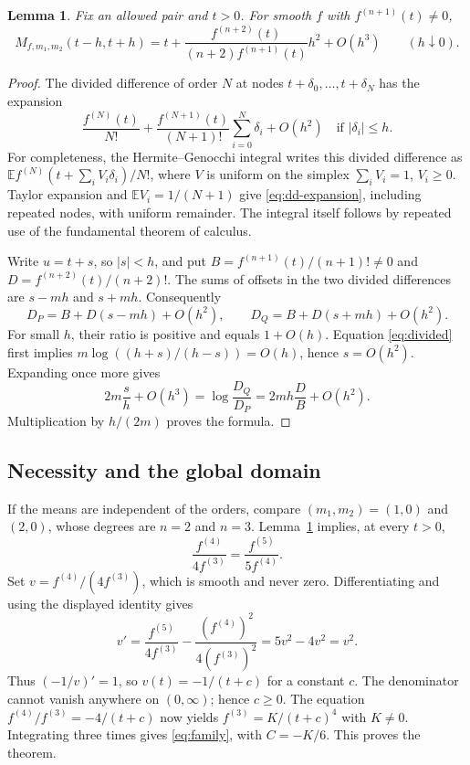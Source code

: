 \documentclass[11pt]{article}
\newtheorem{lemma}{Lemma}
\begin{document}
\begin{lemma}\label{lem:diagonal}
Fix an allowed pair and $t>0$. For smooth $f$ with
$f^{(n+1)}(t)\ne0$,
\[
 M_{f,m_1,m_2}(t-h,t+h)
 =t+\frac{f^{(n+2)}(t)}{(n+2)f^{(n+1)}(t)}h^2+O(h^3)
 \qquad(h\downarrow0).
\]
\end{lemma}
\begin{proof}
The divided difference of order $N$ at nodes $t+\delta_0,\ldots,t+\delta_N$
has the expansion
\begin{equation}\label{eq:dd-expansion}
 \frac{f^{(N)}(t)}{N!}
 +\frac{f^{(N+1)}(t)}{(N+1)!}\sum_{i=0}^N\delta_i+O(h^2)
 \quad\text{if }|\delta_i|\le h.
\end{equation}
For completeness, the Hermite--Genocchi integral writes this divided
difference as $\mathbb E f^{(N)}(t+\sum_i V_i\delta_i)/N!$, where
$V$ is uniform on the simplex $\sum_iV_i=1$, $V_i\ge0$.
Taylor expansion and $\mathbb E V_i=1/(N+1)$ give
\eqref{eq:dd-expansion}, including repeated nodes, with uniform remainder.
The integral itself follows by repeated use of the fundamental theorem
of calculus.

Write $u=t+s$, so $|s|<h$, and put
$B=f^{(n+1)}(t)/(n+1)!\ne0$ and
$D=f^{(n+2)}(t)/(n+2)!$.
The sums of offsets in the two divided differences are $s-mh$ and $s+mh$.
Consequently
\[
 D_P=B+D(s-mh)+O(h^2),\qquad
 D_Q=B+D(s+mh)+O(h^2).
\]
For small $h$, their ratio is positive and equals $1+O(h)$.
Equation \eqref{eq:divided} first implies
$m\log((h+s)/(h-s))=O(h)$, hence $s=O(h^2)$.
Expanding once more gives
\[
 2m\frac{s}{h}+O(h^3)
 =\log\frac{D_Q}{D_P}
 =2mh\frac{D}{B}+O(h^2).
\]
Multiplication by $h/(2m)$ proves the formula.
\end{proof}

\subsection*{Necessity and the global domain}
If the means are independent of the orders, compare $(m_1,m_2)=(1,0)$
and $(2,0)$, whose degrees are $n=2$ and $n=3$.
Lemma~\ref{lem:diagonal} implies, at every $t>0$,
\[
 \frac{f^{(4)}}{4f^{(3)}}=\frac{f^{(5)}}{5f^{(4)}}.
\]
Set $v=f^{(4)}/(4f^{(3)})$, which is smooth and never zero.
Differentiating and using the displayed identity gives
\[
 v'=\frac{f^{(5)}}{4f^{(3)}}
       -\frac{(f^{(4)})^2}{4(f^{(3)})^2}
    =5v^2-4v^2=v^2.
\]
Thus $(-1/v)'=1$, so $v(t)=-1/(t+c)$ for a constant $c$.
The denominator cannot vanish anywhere on $(0,\infty)$; hence $c\ge0$.
The equation $f^{(4)}/f^{(3)}=-4/(t+c)$ now yields
$f^{(3)}=K/(t+c)^4$ with $K\ne0$. Integrating three times gives
\eqref{eq:family}, with $C=-K/6$. This proves the theorem.
\end{document}
